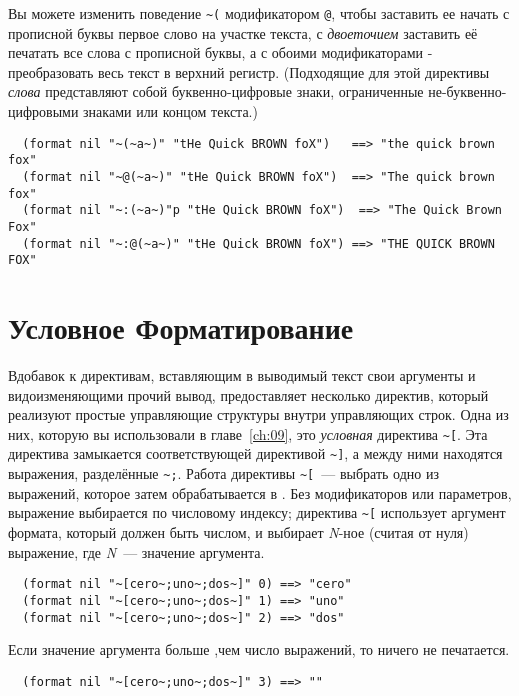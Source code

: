 {Вы можете изменить поведение \lstinline!~(! модификатором \lstinline!@!, чтобы заставить
ее начать с прописной буквы первое слово на участке текста, с \textit{двоеточием}
заставить её печатать все слова с прописной буквы, а с обоими модификаторами -
преобразовать весь текст в верхний регистр. (Подходящие для этой директивы \textit{слова}
представляют собой буквенно-цифровые знаки, ограниченные не-буквенно-цифровыми знаками или
концом текста.)

\begin{verbatim}
  (format nil "~(~a~)" "tHe Quick BROWN foX")   ==> "the quick brown fox"
  (format nil "~@(~a~)" "tHe Quick BROWN foX")  ==> "The quick brown fox"
  (format nil "~:(~a~)"p "tHe Quick BROWN foX")  ==> "The Quick Brown Fox"
  (format nil "~:@(~a~)" "tHe Quick BROWN foX") ==> "THE QUICK BROWN FOX"
\end{verbatim}

\section{Условное Форматирование}

Вдобавок к директивам, вставляющим в выводимый текст свои аргументы и видоизменяющими
прочий вывод,  предоставляет несколько директив, который реализуют простые
управляющие структуры внутри управляющих строк. Одна из них, которую вы использовали в
главе~\ref{ch:09}, это \textit{условная} директива \lstinline!~[!. Эта директива
замыкается соответствующей директивой \lstinline!~]!, а между ними находятся выражения,
разделённые \lstinline!~;!. Работа директивы \lstinline!~[!~--- выбрать одно из выражений,
которое затем обрабатывается в . Без модификаторов или параметров, выражение
выбирается по числовому индексу; директива \lstinline!~[! использует аргумент формата,
который должен быть числом, и выбирает \textit{N}-ное (считая от нуля) выражение, где
\textit{N}~--- значение аргумента.

\begin{verbatim}
  (format nil "~[cero~;uno~;dos~]" 0) ==> "cero"
  (format nil "~[cero~;uno~;dos~]" 1) ==> "uno"
  (format nil "~[cero~;uno~;dos~]" 2) ==> "dos"
\end{verbatim}

Если значение аргумента больше ,чем число выражений, то ничего не печатается.

\begin{verbatim}
  (format nil "~[cero~;uno~;dos~]" 3) ==> ""
\end{verbatim}

}
